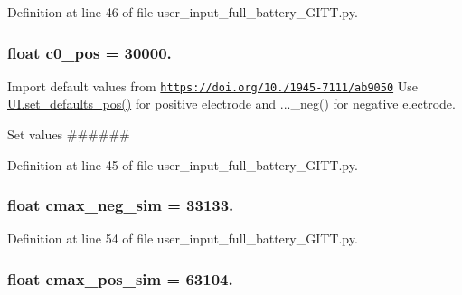 Definition at line 46 of file user\-\_\-input\-\_\-full\-\_\-battery\-\_\-\-G\-I\-T\-T.\-py.

\hypertarget{namespaceuser__input__full__battery___g_i_t_t_a5abfcbf596ddd1acc1de08c37cfde9c3}{
\subsubsection[{c0\-\_\-pos}]{\setlength{\rightskip}{0pt plus 5cm}float c0\-\_\-pos = 30000.}}\label{namespaceuser__input__full__battery___g_i_t_t_a5abfcbf596ddd1acc1de08c37cfde9c3}


Import default values from \href{https://doi.org/10.1149/1945-7111/ab9050}{\tt https\-://doi.\-org/10./1945-\/7111/ab9050} Use \hyperlink{namespaceuser__input__mod_acef497295190e3914f7cd93da2708856}{U\-I.\-set\-\_\-defaults\-\_\-pos()} for positive electrode and ...\-\_\-neg() for negative electrode. 

Set values \#\#\#\#\#\# 

Definition at line 45 of file user\-\_\-input\-\_\-full\-\_\-battery\-\_\-\-G\-I\-T\-T.\-py.

\hypertarget{namespaceuser__input__full__battery___g_i_t_t_ab7633a5e9c70aabfe6992e4fe521a1f9}{
\subsubsection[{cmax\-\_\-neg\-\_\-sim}]{\setlength{\rightskip}{0pt plus 5cm}float cmax\-\_\-neg\-\_\-sim = 33133.}}\label{namespaceuser__input__full__battery___g_i_t_t_ab7633a5e9c70aabfe6992e4fe521a1f9}


Definition at line 54 of file user\-\_\-input\-\_\-full\-\_\-battery\-\_\-\-G\-I\-T\-T.\-py.

\hypertarget{namespaceuser__input__full__battery___g_i_t_t_aa5b015cc7d0bda453c6163023448db72}{
\subsubsection[{cmax\-\_\-pos\-\_\-sim}]{\setlength{\rightskip}{0pt plus 5cm}float cmax\-\_\-pos\-\_\-sim = 63104.}}\label{namespaceuser__input__full__battery___g_i_t_t_aa5b015cc7d0bda453c6163023448db72}


